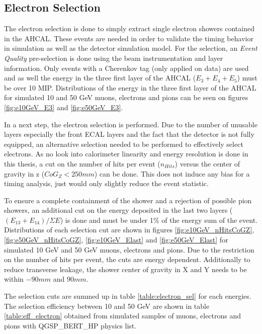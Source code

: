\subsection{Electron Selection}
\label{subsec:elec_sel}

The electron selection is done to simply extract single electron showers contained in the AHCAL. These events are needed in order to validate the timing behavior in simulation as well as the detector simulation model. For the selection, an \textit{Event Quality} pre-selection is done using the beam instrumentation and layer information. Only events with a Cherenkov tag (only applied on data) are used and as well the energy in the three first layer of the AHCAL ($E_3+E_4+E_5$) must be over 10 MIP. Distributions of the energy in the three first layer of the AHCAL for simulated 10 and 50 GeV muons, electrons and pions can be seen on figures \ref{fig:e10GeV_E3} and \ref{fig:e50GeV_E3}.

In a next step, the electron selection is performed. Due to the number of unusable layers especially the front ECAL layers and the fact that the detector is not fully equipped, an alternative selection needed to be performed to effectively select electrons. As no look into calorimeter linearity and energy resolution is done in this thesis, a cut on the number of hits per event ($n_{Hits}$) versus the center of gravity in z ($CoG_Z < 250 mm$) can be done. This does not induce any bias for a timing analysis, just would only slightly reduce the event statistic.

To ensure a complete containment of the shower and a rejection of possible pion showers, an additional cut on the energy deposited in the last two layers ($(E_{13}+E_{14})/\Sigma E$) is done and must be under 1\% of the energy sum of the event. Distributions of each selection cut are shown in figures \ref{fig:e10GeV_nHitsCoGZ}, \ref{fig:e50GeV_nHitsCoGZ}, \ref{fig:e10GeV_Elast} and \ref{fig:e50GeV_Elast} for simulated 10 GeV and 50 GeV muons, electrons and pions. Due to the restriction on the number of hits per event, the cuts are energy dependent. Additionally to reduce transverse leakage, the shower center of gravity in X and Y needs to be within $-90 mm$ and $90 mm$.

The selection cuts are summed up in table \ref{table:electron_sel} for each energies. The selection efficiency between 10 and 50 GeV are shown in table \ref{table:eff_electron} obtained from simulated samples of muons, electrons and pions with QGSP\_BERT\_HP physics list.

